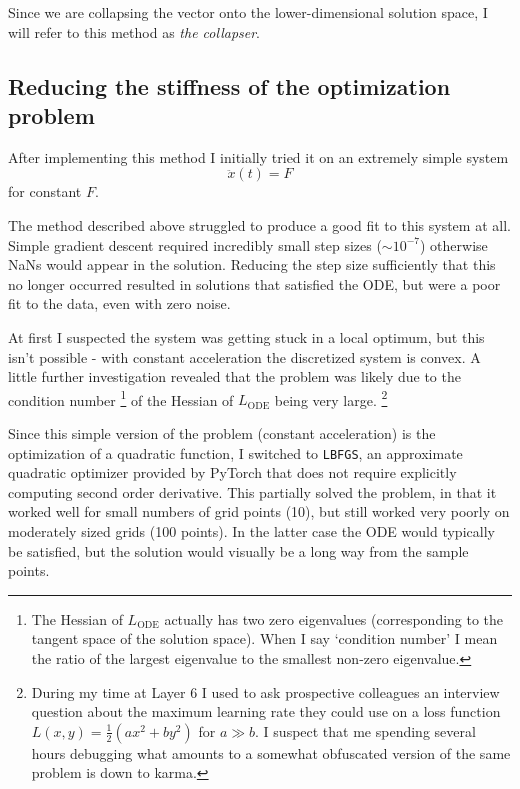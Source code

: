 \documentclass{article}
\begin{document}
Since we are collapsing the vector onto the lower-dimensional solution space, I will refer to this method as \emph{the collapser}.

\subsection{Reducing the stiffness of the optimization problem}
\label{sec:stiffness}

After implementing this method I initially tried it on an extremely simple system
$$
\ddot{x}(t) = F
$$
for constant $F$.

The method described above struggled to produce a good fit to this system at all.
Simple gradient descent required incredibly small step sizes ($\sim 10^{-7}$) otherwise NaNs would appear in the solution.
Reducing the step size sufficiently that this no longer occurred resulted in solutions that satisfied the ODE, but were a poor fit to the data, even with zero noise.

At first I suspected the system was getting stuck in a local optimum, but this isn't possible - with constant acceleration the discretized system is convex.
A little further investigation revealed that the problem was likely due to the condition number%
\footnote{
The Hessian of $L_{\mathrm{ODE}}$ actually has two zero eigenvalues (corresponding to the tangent space of the solution space). When I say `condition number' I mean the ratio of the largest eigenvalue to the smallest non-zero eigenvalue.
}
 of the Hessian of $L_{\mathrm{ODE}}$ being very large.%
\footnote{
During my time at Layer 6 I used to ask prospective colleagues an interview question about the maximum learning rate they could use on a loss function $L(x, y) = \frac{1}{2} \left( a x^2 + b y^2 \right)$ for $ a \gg b$.
I suspect that me spending several hours debugging what amounts to a somewhat obfuscated version of the same problem is down to karma.
}

Since this simple version of the problem (constant acceleration) is the optimization of a quadratic function, I switched to \texttt{LBFGS}, an approximate quadratic optimizer provided by PyTorch that does not require explicitly computing second order derivative.
This partially solved the problem, in that it worked well for small numbers of grid points (10), but still worked very poorly on moderately sized grids (100 points).
In the latter case the ODE would typically be satisfied, but the solution would visually be a long way from the sample points.
\end{document}
